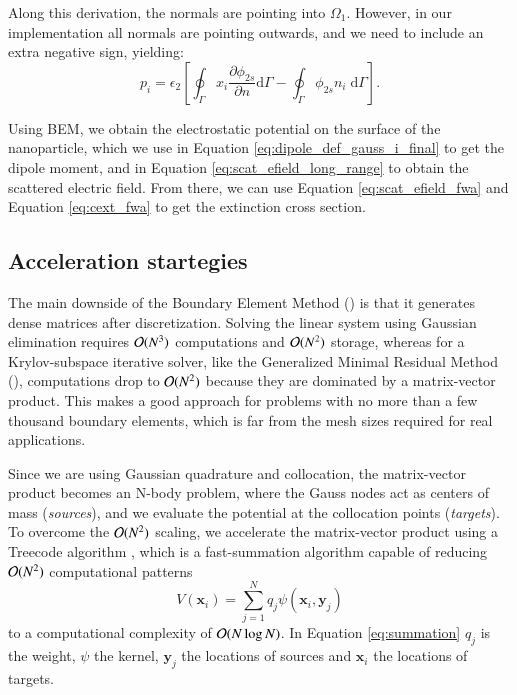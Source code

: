 %
Along this derivation, the normals are pointing into $\Omega_1$. However, in our implementation 
all normals are pointing outwards, and we need to include an extra negative sign, yielding:
%
\begin{equation} \label{eq:dipole_def_gauss_i_final}
{p_i} = \epsilon_2 \left[ \oint_\Gamma  x_i  \frac{\partial \phi_{2s}}{\partial n} \text{d}\Gamma - \oint_\Gamma \phi_{2s} n_i \; \text{d}\Gamma \right].
\end{equation}

Using BEM, we obtain the electrostatic potential on the surface of the nanoparticle, 
which we use in Equation \eqref{eq:dipole_def_gauss_i_final} to get the dipole 
moment, and in Equation \eqref{eq:scat_efield_long_range} to obtain the scattered
electric field. From there, we can use Equation \eqref{eq:scat_efield_fwa} and Equation 
\eqref{eq:cext_fwa} to get the extinction cross section.

\subsection{Acceleration startegies} \label{sec:acc_strategies}

The main downside of the Boundary Element Method (\bem) is that it generates dense matrices
after discretization. Solving the linear system using
Gaussian elimination requires $\mathcal{O}(N^3)$ computations and $\mathcal{O}(N^2)$ storage, whereas for a
Krylov-subspace iterative solver, like the Generalized Minimal Residual Method (\gmres),
computations drop to $\mathcal{O}(N^2)$ because they are dominated by a matrix-vector 
product. This makes \bem a good approach for problems with no more than a few thousand boundary elements,
which is far from the mesh sizes required for real applications. 

Since we are using Gaussian quadrature and collocation, the matrix-vector product
becomes an N-body problem, where the Gauss nodes act as centers of mass (\emph{sources}), and we evaluate
the potential at the collocation points (\emph{targets}).
To overcome the $\mathcal{O}(N^2)$ scaling,
we accelerate the matrix-vector product using a Treecode algorithm \cite{BarnesHut1986,DuanKrasny2001}, 
which is a fast-summation algorithm capable of reducing $\mathcal{O}(N^2)$
computational patterns 
%
\begin{equation} \label{eq:summation}
V(\mathbf{x}_i) = \sum_{j=1}^{N} q_j \psi(\mathbf{x}_i, \mathbf{y}_j) 
\end{equation}
%
\noindent to a computational complexity of $\mathcal{O}(N \log N)$. In Equation \eqref{eq:summation} 
$q_j$ is the weight, $\psi$ the kernel, $\mathbf{y}_j$ the locations of sources and 
$\mathbf{x}_i$ the locations of targets.

